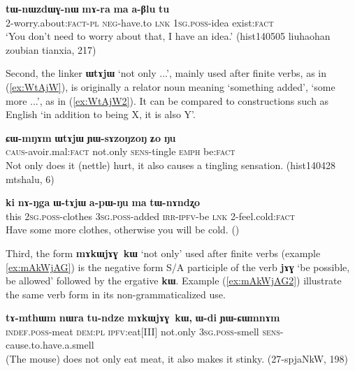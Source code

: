 \documentclass[oldfontcommands,oneside,a4paper,11pt]{article}
\newcommand{\ipa}[1]{\mbox{\phon\textbf{#1}}} %
\begin{document}
\begin{exe}
\ex \label{ex:marama2}
\gll
\ipa{tɯ-nɯzdɯɣ-nɯ} 	\ipa{mɤ-ra} 	\ipa{ma} 	\ipa{a-βlu} 	\ipa{tu}\\
2-worry.about:\textsc{fact-pl} \textsc{neg}-have.to \textsc{lnk} \textsc{1sg.poss}-idea exist:\textsc{fact}\\
\glt `You don't need to worry about that, I have an idea.' (hist140505 liuhaohan zoubian tianxia, 217)
\end{exe}
 

Second, the linker \ipa{ɯtɤjɯ} `not only ...', mainly used after finite verbs, as in (\ref{ex:WtAjW}), is originally a relator noun meaning `something added', `some more ...', as in (\ref{ex:WtAjW2}). It can be compared to constructions such as English `in addition to being X, it is also Y'.

\begin{exe}
\ex \label{ex:WtAjW}
\gll \ipa{ɕɯ-mŋɤm} 	\ipa{ɯtɤjɯ} 	\ipa{ɲɯ-sɤzoŋzoŋ} 	\ipa{ʑo} 	\ipa{ŋu}  \\
\textsc{caus}-avoir.mal:\textsc{fact} not.only \textsc{sens}-tingle \textsc{emph} be:\textsc{fact} \\
\glt Not only does it (nettle) hurt, it also causes a tingling sensation. (hist140428 mtshalu, 6)
\end{exe}

\begin{exe}
\ex \label{ex:WtAjW2}
\gll \ipa{ki} 	\ipa{nɤ-ŋga} 	\ipa{ɯ-tɤjɯ} 	\ipa{a-pɯ-ŋu} 	\ipa{ma} 	\ipa{tɯ-nɤndʐo} \\
this \textsc{2sg.poss}-clothes \textsc{3sg.poss}-added \textsc{irr-ipfv}-be \textsc{lnk} 2-feel.cold:\textsc{fact} \\
\glt Have some more clothes, otherwise you will be cold. (\citealt{jacques15japhug})
\end{exe}

Third, the form \ipa{mɤkɯjɤɣ kɯ} `not only' used after finite verbs (example \ref{ex:mAkWjAG}) is the negative form S/A participle of the verb \ipa{jɤɣ} `be possible, be allowed' followed by the ergative \ipa{kɯ}. Example (\ref{ex:mAkWjAG2}) illustrate the same verb form in its non-grammaticalized use.

 \begin{exe}
\ex \label{ex:mAkWjAG}
\gll  \ipa{tɤ-mthɯm} 	\ipa{nɯra} 	\ipa{tu-ndze} 	\ipa{mɤkɯjɤɣ kɯ,} 	\ipa{ɯ-di} 	\ipa{ɲɯ-ɕɯmnɤm}  \\
\textsc{indef.poss}-meat \textsc{dem:pl} \textsc{ipfv}:eat[III] not.only \textsc{3sg.poss}-smell \textsc{sens}-cause.to.have.a.smell \\
\glt  (The mouse) does not only eat meat, it also makes it stinky. (27-spjaNkW, 198)
\end{exe}
\end{document}
